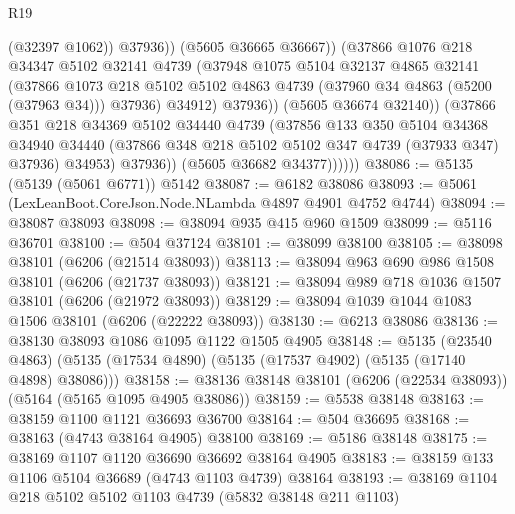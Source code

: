 \begin{lexlean}{R19}
\begin{coremodule}
{{{{{{{{{{{                            (@32397 @1062))
                          @37936))
                      (@5605 @36665 @36667))
                    (@37866
                      @1076
                      @218
                      @34347
                      @5102
                      @32141
                      @4739
                      (@37948
                        @1075
                        @5104
                        @32137
                        @4865
                        @32141
                        (@37866
                          @1073
                          @218
                          @5102
                          @5102
                          @4863
                          @4739
                          (@37960 @34 @4863 (@5200 (@37963 @34)))
                          @37936)
                        @34912)
                      @37936))
                  (@5605 @36674 @32140))
                (@37866
                  @351
                  @218
                  @34369
                  @5102
                  @34440
                  @4739
                  (@37856
                    @133
                    @350
                    @5104
                    @34368
                    @34940
                    @34440
                    (@37866 @348 @218 @5102 @5102 @347 @4739 (@37933 @347) @37936)
                    @34953)
                  @37936))
              (@5605 @36682 @34377))))))
@38086 := @5135 (@5139 (@5061 @6771)) @5142
@38087 := @6182 @38086
@38093 := @5061 (LexLeanBoot.CoreJson.Node.NLambda @4897 @4901 @4752 @4744)
@38094 := @38087 @38093
@38098 := @38094 @935 @415 @960 @1509
@38099 := @5116 @36701
@38100 := @504 @37124
@38101 := @38099 @38100
@38105 := @38098 @38101 (@6206 (@21514 @38093))
@38113 := @38094 @963 @690 @986 @1508 @38101 (@6206 (@21737 @38093))
@38121 := @38094 @989 @718 @1036 @1507 @38101 (@6206 (@21972 @38093))
@38129 := @38094 @1039 @1044 @1083 @1506 @38101 (@6206 (@22222 @38093))
@38130 := @6213 @38086
@38136 := @38130 @38093 @1086 @1095 @1122 @1505 @4905
@38148 := @5135
    (@23540 @4863)
    (@5135 (@17534 @4890) (@5135 (@17537 @4902) (@5135 (@17140 @4898) @38086)))
@38158 := @38136 @38148 @38101 (@6206 (@22534 @38093)) (@5164 (@5165 @1095 @4905 @38086))
@38159 := @5538 @38148
@38163 := @38159 @1100 @1121 @36693 @36700
@38164 := @504 @36695
@38168 := @38163 (@4743 @38164 @4905) @38100
@38169 := @5186 @38148
@38175 := @38169 @1107 @1120 @36690 @36692 @38164 @4905
@38183 := @38159 @133 @1106 @5104 @36689 (@4743 @1103 @4739) @38164
@38193 := @38169 @1104 @218 @5102 @5102 @1103 @4739 (@5832 @38148 @211 @1103)
}}}}}}}}}}}
\end{coremodule}
\end{lexlean}
